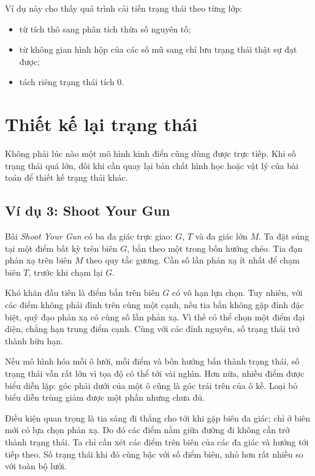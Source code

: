 \documentclass[11pt]{article}
\begin{document}
Ví dụ này cho thấy quá trình cải tiến trạng thái theo từng lớp:
\begin{itemize}
  \item từ tích thô sang phân tích thừa số nguyên tố;
  \item từ không gian hình hộp của các số mũ sang chỉ lưu trạng thái thật sự
  đạt được;
  \item tách riêng trạng thái tích \(0\).
\end{itemize}

\section{Thiết kế lại trạng thái}

Không phải lúc nào một mô hình kinh điển cũng dùng được trực tiếp. Khi số trạng
thái quá lớn, đôi khi cần quay lại bản chất hình học hoặc vật lý của bài toán
để thiết kế trạng thái khác.

\subsection{Ví dụ 3: Shoot Your Gun}

Bài \textit{Shoot Your Gun} có ba đa giác trực giao: \(G\), \(T\) và đa giác
lớn \(M\). Ta đặt súng tại một điểm bất kỳ trên biên \(G\), bắn theo một trong
bốn hướng chéo. Tia đạn phản xạ trên biên \(M\) theo quy tắc gương. Cần số lần
phản xạ ít nhất để chạm biên \(T\), trước khi chạm lại \(G\).

Khó khăn đầu tiên là điểm bắn trên biên \(G\) có vô hạn lựa chọn. Tuy nhiên,
với các điểm không phải đỉnh trên cùng một cạnh, nếu tia bắn không gặp đỉnh
đặc biệt, quỹ đạo phản xạ có cùng số lần phản xạ. Vì thế có thể chọn một điểm
đại diện, chẳng hạn trung điểm cạnh. Cùng với các đỉnh nguyên, số trạng thái
trở thành hữu hạn.

Nếu mô hình hóa mỗi ô lưới, mỗi điểm và bốn hướng bắn thành trạng thái, số
trạng thái vẫn rất lớn vì tọa độ có thể tới vài nghìn. Hơn nữa, nhiều điểm
được biểu diễn lặp: góc phải dưới của một ô cũng là góc trái trên của ô kề.
Loại bỏ biểu diễn trùng giảm được một phần nhưng chưa đủ.

Điều kiện quan trọng là tia sáng đi thẳng cho tới khi gặp biên đa giác; chỉ ở
biên mới có lựa chọn phản xạ. Do đó các điểm nằm giữa đường đi không cần trở
thành trạng thái. Ta chỉ cần xét các điểm trên biên của các đa giác và hướng
tới tiếp theo. Số trạng thái khi đó cùng bậc với số điểm biên, nhỏ hơn rất
nhiều so với toàn bộ lưới.
\end{document}
